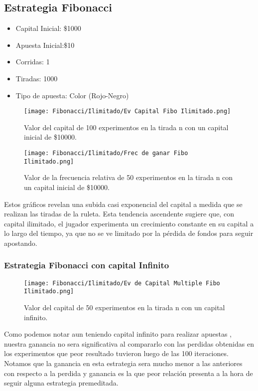 \documentclass{article}
\begin{document}
\subsection{Estrategia Fibonacci}

\begin{itemize}[noitemsep]
\item Capital Inicial: \$1000
\item Apuesta Inicial:\$10
\item Corridas: 1
\item Tiradas: 1000
\item Tipo de apuesta: Color (Rojo-Negro)
\end{itemize}

    \begin{figure} [H]
        \centering
            \texttt{[image: Fibonacci/Ilimitado/Ev Capital Fibo Ilimitado.png]}
            \caption{Valor del capital de 100 experimentos en la tirada n con un capital inicial de \$10000.}
            \label{fig:grafico}
    \end{figure}  
    
    \begin{figure}[H]
        \centering
            \texttt{[image: Fibonacci/Ilimitado/Frec de ganar Fibo Ilimitado.png]}
            \caption{Valor de la frecuencia relativa de 50 experimentos en la tirada n con un capital inicial de \$10000.}
            \label{fig:grafico}
    \end{figure}

Estos gráficos revelan una subida casi exponencial del capital a medida que se realizan las tiradas de la ruleta. Esta tendencia ascendente sugiere que, con capital ilimitado, el jugador experimenta un crecimiento constante en su capital a lo largo del tiempo, ya que no se ve limitado por la pérdida de fondos para seguir apostando. 

\subsubsection{Estrategia Fibonacci con capital Infinito}
        
\begin{figure}
    \centering
    \texttt{[image: Fibonacci/Ilimitado/Ev de Capital Multiple Fibo Ilimitado.png]}
    \caption{Valor del capital de 50 experimentos en la tirada n con un capital infinito.}
    \label{fig:enter-label}
\end{figure}
Como podemos notar aun teniendo capital infinito para realizar apuestas , nuestra ganancia no sera significativa al compararlo con las perdidas obtenidas en los experimentos que peor resultado tuvieron luego de las 100 iteraciones. Notamos que la ganancia en esta estrategia sera mucho menor a las anteriores con respecto a la perdida y ganancia es la que peor relación presenta a la hora de seguir alguna estrategia premeditada.
\end{document}
